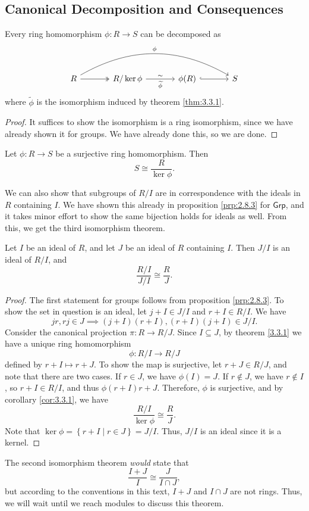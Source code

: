 \subsection{Canonical Decomposition and Consequences}
\begin{theorem}\label{thm:3.3.2}
	Every ring homomorphism $\phi : R \to S$ can be decomposed as
	\[\begin{tikzcd}[row sep=2.5em, column sep=3.5em]
		R\arrow[rrr, bend left, "\phi "]\arrow[r, two heads]&R /\ker \phi  \arrow[r, "\sim ","\widetilde{\phi}"']& \phi (R)\arrow[r, hook]&S
	\end{tikzcd}\]
	where $\widetilde{\phi}$ is the isomorphism induced by theorem \ref{thm:3.3.1}.
\end{theorem}
\begin{proof}
	It suffices to show the isomorphism is a ring isomorphism, since we have already shown it for groups. We have already done this, so we are done.
\end{proof}
\begin{corollary}\label{cor:3.3.1}
	Let $\phi : R \to S$ be a surjective ring homomorphism. Then
	\[
		S\cong \frac{R}{\ker \phi }
	.\]
\end{corollary}
We can also show that subgroups of $R /I$ are in correspondence with the ideals in $R$ containing $I$. We have shown this already in proposition \ref{prp:2.8.3} for $\mathsf{Grp}$, and it takes minor effort to show the same bijection holds for ideals as well. From this, we get the third isomorphism theorem.
\begin{proposition}\label{prp:3.3.2}
	Let $I$ be an ideal of $R$, and let $J$ be an ideal of $R$ containing $I$. Then $J /I$ is an ideal of $R /I$, and
	\[
		\frac{R /I}{J /I}\cong \frac{R}{J}
	.\]
\end{proposition}
\begin{proof}
	The first statement for groups follows from proposition \ref{prp:2.8.3}. To show the set in question is an ideal, let $j + I\in J /I$ and $r + I\in R /I$. We have
	\[
		jr,rj\in J \implies (j + I)(r+I),(r+I)(j+I)\in J /I
	.\]
	Consider the canonical projection $\pi : R \to R / J$. Since $I\subseteq J$, by theorem \ref{3.3.1} we have a unique ring homomorphism
	\[
		\phi : R /I \to R /J
	\]
	defined by $r+I \mapsto r+J$. To show the map is surjective, let $r+J\in R /J$, and note that there are two cases. If $r\in J$, we have $\phi (I)=J$. If $r\notin J$, we have $r\notin I$, so $r+I\in R /I$, and thus $\phi (r+I)r+J$. Therefore, $\phi $ is surjective, and by corollary \ref{cor:3.3.1}, we have
	\[
		\frac{R /I}{\ker \phi }\cong \frac{R}{J}
	.\]
	Note that $\ker \phi =\left\{ r+I \mid r \in J \right\} =J /I$. Thus, $J /I$ is an ideal since it is a kernel.
\end{proof}

The second isomorphism theorem \emph{would} state that
\[
	\frac{I+J}{I}\cong \frac{J}{I\cap J}
,\]
but according to the conventions in this text, $I+J$ and $I\cap J$ are not rings. Thus, we will wait until we reach modules to discuss this theorem.
